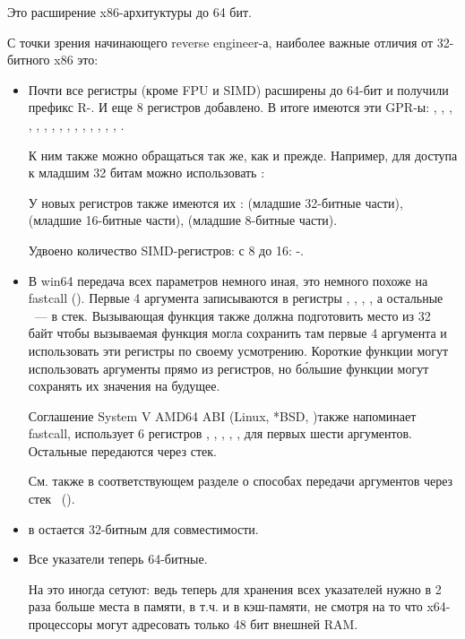 
\label{x86-64}

Это расширение x86-архитуктуры до 64 бит.

С точки зрения начинающего reverse engineer-а, наиболее важные отличия от 32-битного x86 это:

\myindex{\CLanguageElements!\Pointers}
\begin{itemize}

\item
Почти все регистры (кроме FPU и SIMD) расширены до 64-бит и получили префикс R-. 
И еще 8 регистров добавлено. 
В итоге имеются эти \ac{GPR}-ы:
 \RAX, \RBX, \RCX, \RDX, 
\RBP, \RSP, \RSI, \RDI, , , , 
, , , , . 

К ним также можно обращаться так же, как и прежде. Например, для доступа к младшим 32 битам \RAX 
можно использовать \EAX:


У новых регистров  также имеются их :  
(младшие 32-битные части), 
 (младшие 16-битные части),  (младшие 8-битные части).


Удвоено количество SIMD-регистров: с 8 до 16: -.

\item
В win64 передача всех параметров немного иная, это немного похоже на fastcall 
().
Первые 4 аргумента записываются в регистры \RCX, \RDX, , , а остальные ~--- в стек. 
Вызывающая функция также должна подготовить место из 32 байт чтобы вызываемая функция могла сохранить 
там первые 4 аргумента и использовать эти регистры по своему усмотрению. 
Короткие функции могут использовать аргументы прямо из регистров, но б\'{о}льшие функции могут сохранять 
их значения на будущее.

Соглашение System V AMD64 ABI (Linux, *BSD, \MacOSX)\SysVABI также напоминает
fastcall, использует 6 регистров 
\RDI, \RSI, \RDX, \RCX, ,  для первых шести аргументов.
Остальные передаются через стек.

См. также в соответствующем разделе о способах передачи аргументов через стек ~().

\item
\Tint в \CCpp остается 32-битным для совместимости.

\item
Все указатели теперь 64-битные.

На это иногда сетуют: ведь теперь для хранения всех указателей нужно в 2 раза больше места 
в памяти, в т.ч. и в кэш-памяти, не смотря на то что x64-процессоры могут адресовать только 48 бит
внешней \ac{RAM}.

\end{itemize}

